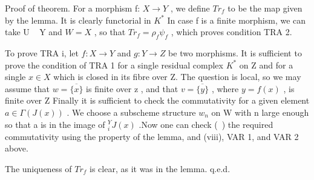 \documentclass[12pt]{book}
\begin{document}
\setcounter{page}{348}
Proof of theorem. For a morphism f: \(X \to Y\) , we define \(Tr_{f}\) to be the map given by the lemma. It is clearly functorial in \(K^{*}\) In case f is a finite morphism, we can take U ~ Y and \(W=X\) , so that \(Tr_{f}=\rho_{f} \psi_{f}\) , which proves condition TRA 2.

To prove TRA i, let \(f: X \to Y\) and \(g: Y \to Z\) be two morphisms. It is sufficient to prove the condition of TRA 1 for a single residual complex \(K^{*}\) on Z and for a single \(x \in X\) which is closed in its fibre over Z. The question is local, so we may assume that \(w=\overline{\{x\}}\) is finite over z , and that \(v=\overline{\{y\}}\) , where \(y=f(x)\) , is finite over Z Finally it is sufficient to check the commutativity for a given element \(a \in \Gamma(J(x))\) . We choose a subscheme structure \(w_{n}\) on W with n large enough so that a is in the image of \(_{i}^{Y} J(x)\) .Now one can check (~) the required commutativity using the property of the lemma, and (viii), VAR 1,
and VAR 2 above.

The uniqueness of \(Tr_{f}\) is clear, as it was in the lemma.
q.e.d.
\end{document}
